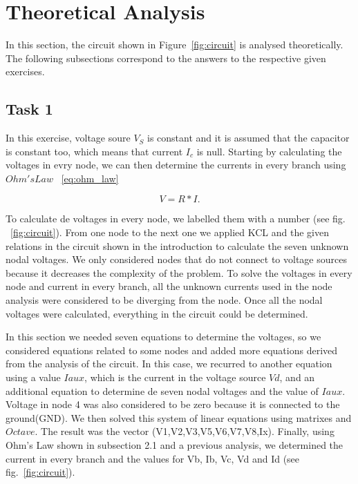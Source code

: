 \section{Theoretical Analysis}
\label{sec:analysis}

In this section, the circuit shown in Figure~\ref{fig:circuit} is analysed theoretically. The following subsections correspond to the answers to the respective given exercises. 

\subsection{Task 1}

In this exercise, voltage soure $V_{S}$ is constant and it is assumed that the capacitor is constant too, which means that current $I_{c}$ is null.
Starting by calculating the voltages in evry node, we can then determine the currents in every branch using $Ohm's Law$ ~\ref{eq:ohm_law} 

\begin{equation}
  V= R*I.
  \label{eq:ohm_law}
\end{equation}


To calculate de voltages in every node, we labelled them with a number (see fig. ~\ref{fig:circuit}). From one node to the next one we applied KCL and the given relations in the circuit shown in the introduction to calculate the seven unknown nodal voltages. We only considered nodes that do not connect to voltage sources because it decreases the complexity of the problem. 
To solve the voltages in every node and current in every branch, all the unknown currents used in the node analysis were considered to be diverging from the node. Once all the nodal voltages were calculated, everything in the circuit could be determined.

In this section we needed seven equations to determine the voltages, so we considered equations related to some nodes and added more equations derived from the analysis of the circuit. In this case, we recurred to another equation using a value $Iaux$, which is the current in the voltage source $Vd$, and an additional equation to determine de seven nodal voltages and the value of $Iaux$. Voltage in node 4 was also considered to be zero because it is connected to the ground(GND). We then solved this system of linear equations using matrixes and $Octave$. The result was the vector (V1,V2,V3,V5,V6,V7,V8,Ix). Finally, using Ohm’s Law shown in subsection 2.1 and a previous analysis, we determined the current in every branch and the values for Vb, Ib, Vc, Vd and Id (see fig.~\ref{fig:circuit}).



